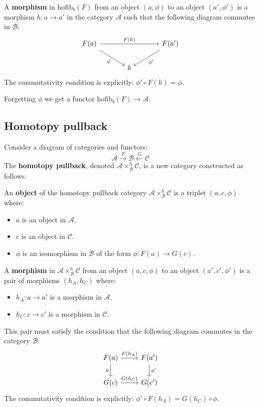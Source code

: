 \documentclass[11pt]{article}
\newcommand{\cat}[1]{\mathcal{#1}}
\theoremstyle{definition}
\begin{document}
A \textbf{morphism} in $\mathrm{hofib}_b(F)$ from an object $(a, \phi)$ to an object $(a', \phi')$ is a morphism $h : a \to a'$ in the category $\mathcal{A}$ such that the following diagram commutes in $\mathcal{B}$:
\[
\begin{tikzcd}[column sep=large]
    F(a) \arrow{rr}{F(h)} \arrow{dr}[swap]{\phi} & & F(a') \arrow{dl}{\phi'} \\
    & b &
\end{tikzcd}
\]
The commutativity condition is explicitly: $\phi' \circ F(h) = \phi$.

Forgetting $\phi$ we get a functor $\mathrm{hofib}_b(F) \to \cat{A}$.


\subsection{Homotopy pullback}



Consider a diagram of categories and functors:
\[
    \mathcal{A} \xrightarrow{F} \mathcal{B} \xleftarrow{G} \mathcal{C}
\]
The \textbf{homotopy pullback}, denoted $\mathcal{A} \times^h_{\mathcal{B}} \mathcal{C}$, is a new category constructed as follows.


An \textbf{object} of the homotopy pullback category $\mathcal{A} \times^h_{\mathcal{B}} \mathcal{C}$ is a triplet $(a, c, \phi)$ where:
\begin{itemize}
    \item $a$ is an object in $\mathcal{A}$.
    \item $c$ is an object in $\mathcal{C}$.
    \item $\phi$ is an isomorphism   in $\mathcal{B}$ of the form $\phi : F(a) \to G(c)$.
\end{itemize}




A \textbf{morphism} in $\mathcal{A} \times^h_{\mathcal{B}} \mathcal{C}$ from an object $(a, c, \phi)$ to an object $(a', c', \phi')$ is a pair of morphisms $(h_A, h_C)$ where:
\begin{itemize}
    \item $h_A : a \to a'$ is a morphism in $\mathcal{A}$.
    \item $h_C : c \to c'$ is a morphism in $\mathcal{C}$.
\end{itemize}
This pair must satisfy the condition that the following diagram commutes in the category $\mathcal{B}$:
\[
\begin{tikzcd}
    F(a) \arrow{r}{F(h_A)} \arrow{d}[swap]{\phi} & F(a') \arrow{d}{\phi'} \\
    G(c) \arrow{r}{G(h_C)} & G(c')
\end{tikzcd}
\]
The commutativity condition is explicitly: $\phi' \circ F(h_A) = G(h_C) \circ \phi$.
\end{document}
